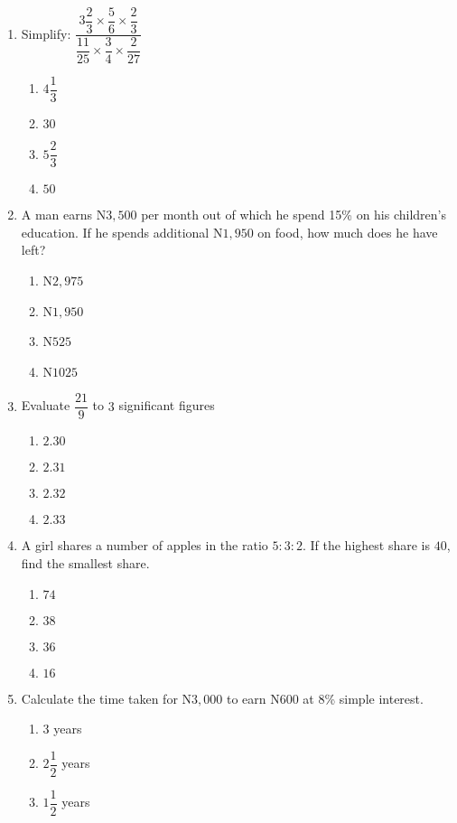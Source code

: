 \begin{multicols}{2}
\begin{enumerate}[label={\arabic*.}]
\begin{enumerate}[label={\Alph*.}]
    \end{enumerate}
\item Simplify: \(\dfrac{3\dfrac{2}{3} \times \dfrac{5}{6} \times \dfrac{2}{3}}{\dfrac{11}{25} \times \dfrac{3}{4} \times \dfrac{2}{27}}\)
    \begin{enumerate}[label={\Alph*.}]
    \item \(4\dfrac{1}{3}\)
    \item \(30\)
    \item \(5\dfrac{2}{3}\)
    \item \(50\)
    \end{enumerate}
\item A man earns N\(3,500\) per month out of which he spend 15\% on his children's education. If he spends additional N\(1,950\) on food, how much does he have left? 
    \begin{enumerate}[label={\Alph*.}]
    \item N\(2,975\)
    \item N\(1,950\)
    \item N\(525\)
    \item N\(1025\)
    \end{enumerate}
\item Evaluate \(\dfrac{21}{9}\) to \(3\) significant figures
    \begin{enumerate}[label={\Alph*.}]
    \item \(2.30\)
    \item \(2.31\)
    \item \(2.32\)
    \item \(2.33\)
    \end{enumerate}
\item A girl shares a number of apples in the ratio \(5:3:2\). If the highest share is \(40\), find the smallest share.
    \begin{enumerate}[label={\Alph*.}]
    \item \(74\)
    \item \(38\)
    \item \(36\)
    \item \(16\)
    \end{enumerate}
\item Calculate the time taken for N\(3,000\) to earn N\(600\) at 8\% simple interest.
    \begin{enumerate}[label={\Alph*.}]
    \item \(3\) years
    \item \(2\dfrac{1}{2}\) years
    \item \(1\dfrac{1}{2}\) years

\end{enumerate}
\end{enumerate}
\end{multicols}
